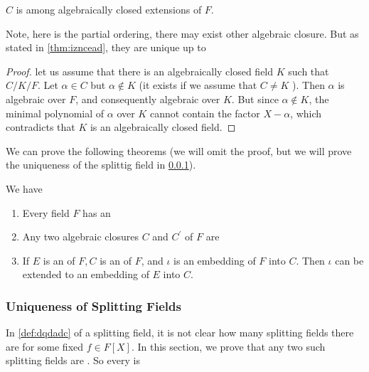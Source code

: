 \documentclass{article}
\begin{document}
\begin{lema}\label{lrm:donaccz}
$C$ is  among algebraically closed extensions of $F$.
\end{lema}
\begin{rema}
Note, here  is the partial ordering, there may exist other {algebraic closure}. But as stated in \cref{thm:izncead}, they are unique up to 
\end{rema}
\begin{proof}
let us assume that there is an algebraically closed field $K$ such that $C / K / F$. Let $\alpha \in C$ but $\alpha \notin K$ (it exists if we assume that $C \neq K$ ). Then $\alpha$ is algebraic over $F$, and consequently algebraic over $K$. But since $\alpha \notin K$, the minimal polynomial of $\alpha$ over $K$ cannot contain the factor $X-\alpha$, which contradicts that $K$ is an algebraically closed field.
\end{proof}




We can prove the following theorems (we will omit the proof, but we will prove the uniqueness of the splittig field in \cref{sec:ioneaddz}).
\begin{thma}\label{thm:izncead}We have 
\begin{enumerate}
    \item Every field $F$ has an 
    \item Any two algebraic closures $C$ and $C^{\prime}$ of $F$ are 
    \item If $E$ is an  of $F, C$ is an  of $F$, and $\iota$ is an embedding of $F$ into $C$. Then $\iota$ can be extended to an embedding of $E$ into $C$.
\end{enumerate}
\end{thma}




\subsubsection{Uniqueness of Splitting Fields}\label{sec:ioneaddz}
In \cref{def:dqdadc} of a splitting field, it is not clear how many splitting fields there are for some fixed $f \in F[X]$. In this section, we prove that any two such splitting fields are . So  every  is  %
\end{document}
